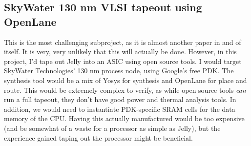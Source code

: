 \documentclass{article}
\begin{document}


\subsection{SkyWater 130 nm VLSI tapeout using OpenLane}
This is the most challenging subproject, as it is almost another paper in and of itself. It is very, very 
unlikely that this will actually be done. However, in this project, I'd tape out Jelly into an ASIC using 
open source tools. I would target SkyWater Technologies' 130 nm process node, using Google's free PDK. The 
synthesis tool would be a mix of Yosys for synthesis and OpenLane for place and route. This would be extremely 
complex to verify, as while open source tools \textit{can} run a full tapeout, they don't have good power and 
thermal analysis tools. In addition, we would need to instantiate PDK-specific SRAM cells for the data memory
of the CPU. Having this actually manufactured would be too expensive (and be somewhat of a waste for a processor
as simple as Jelly), but the experience gained taping out the processor might be beneficial.
\end{document}
